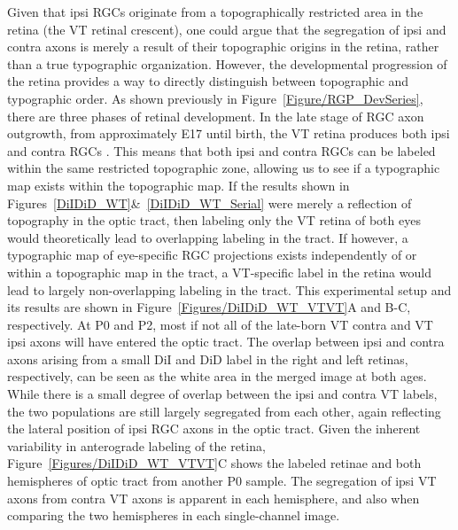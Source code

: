Given that ipsi RGCs originate from a topographically restricted area in the retina (the VT retinal crescent), one could argue that the segregation of ipsi and contra axons is merely a result of their topographic origins in the retina, rather than a true typographic organization.
However, the developmental progression of the retina provides a way to directly distinguish between topographic and typographic order.
As shown previously in Figure~\ref{Figure/RGP_DevSeries}, there are three phases of retinal development.
In the late stage of RGC axon outgrowth, from approximately E17 until birth, the VT retina produces both ipsi and contra RGCs \cite{drager1985birth}.
This means that both ipsi and contra RGCs can be labeled within the same restricted topographic zone, allowing us to see if a typographic map exists within the topographic map.
If the results shown in Figures~\ref{DiIDiD_WT}\&~\ref{DiIDiD_WT_Serial} were merely a reflection of topography in the optic tract, then labeling only the VT retina of both eyes would theoretically lead to overlapping labeling in the tract.
If however, a typographic map of eye-specific RGC projections exists independently of or within a topographic map in the tract, a VT-specific label in the retina would lead to largely non-overlapping labeling in the tract.
This experimental setup and its results are shown in Figure~\ref{Figures/DiIDiD_WT_VTVT}A and B-C, respectively.
At P0 and P2, most if not all of the late-born VT contra and VT ipsi axons will have entered the optic tract.
The overlap between ipsi and contra axons arising from a small DiI and DiD label in the right and left retinas, respectively, can be seen as the white area in the merged image at both ages.
While there is a small degree of overlap between the ipsi and contra VT labels, the two populations are still largely segregated from each other, again reflecting the lateral position of ipsi RGC axons in the optic tract.
Given the inherent variability in anterograde labeling of the retina, Figure~\ref{Figures/DiIDiD_WT_VTVT}C shows the labeled retinae and both hemispheres of optic tract from another P0 sample.
The segregation of ipsi VT axons from contra VT axons is apparent in each hemisphere, and also when comparing the two hemispheres in each single-channel image.

